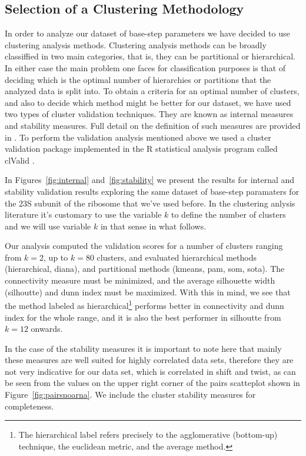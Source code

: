 \subsection{Selection of a Clustering Methodology}
In  order to  analyze  our  dataset of  base-step  parameters we  have
decided  to  use  clustering  analysis methods.   Clustering  analysis
methods can  be broadly classiffied  in two main categories,  that is,
they  can be  partitional or  hierarchical.  In  either case  the main
problem  one faces  for classification  purposes is  that  of deciding
which  is the  optimal number  of hierarchies  or partitions  that the
analyzed  data is split  into.  To  obtain a  criteria for  an optimal
number of  clusters, and also to  decide which method  might be better
for  our  dataset,  we  have  used two  types  of  cluster  validation
techniques.   They  are  known  as  internal  measures  and  stability
measures. Full detail on the  definition of such measures are provided
in  \cite{handl2005, brock2008}.  To  perform the  validation analysis
mentioned above  we used a  cluster validation package  implemented in
the  R  \cite{rcite}   statistical  analysis  program  called  clValid
\cite{brock2008}.

In  Figures~\ref{fig:internal} and~\ref{fig:stability} we  present the
results for  internal and  stability validation results  exploring the
same  dataset of  base-step  paramaters  for the  23S  subunit of  the
ribosome that we've used  before. In the clustering anlysis literature
it's  customary  to use  the  variable $k$  to  define  the number  of
clusters  and  we  will  use  variable  $k$  in  that  sense  in  what
follows.

Our analysis computed  the validation scores for a  number of clusters
ranging from $k=2$, up  to $k=80$ clusters, and evaluated hierarchical
methods (hierarchical,  diana), and partitional  methods (kmeans, pam,
som,  sota).  The  connectivity  measure must  be  minimized, and  the
average silhouette width (silhoutte) and dunn index must be maximized.
With   this   in  mind,   we   see   that   the  method   labeled   as
hierarchical\footnote{The hierarchical  label refers precisely  to the
  agglomerative (bottom-up)  technique, the euclidean  metric, and the
  average method.}  performs better in connectivity and dunn index for
the whole range,  and it is also the best  performer in silhoutte from
$k=12$ onwards.

In the  case of the  stability measures it  is important to  note here
that mainly these measures are  well suited for highly correlated data
sets, therefore they  are not very indicative for  our data set, which
is correlated  in shift and twist, as  can be seen from  the values on
the   upper  right   corner   of  the   pairs   scatteplot  shown   in
Figure~\ref{fig:pairsnoarna}.    We  include  the cluster  stability
measures for completeness.

